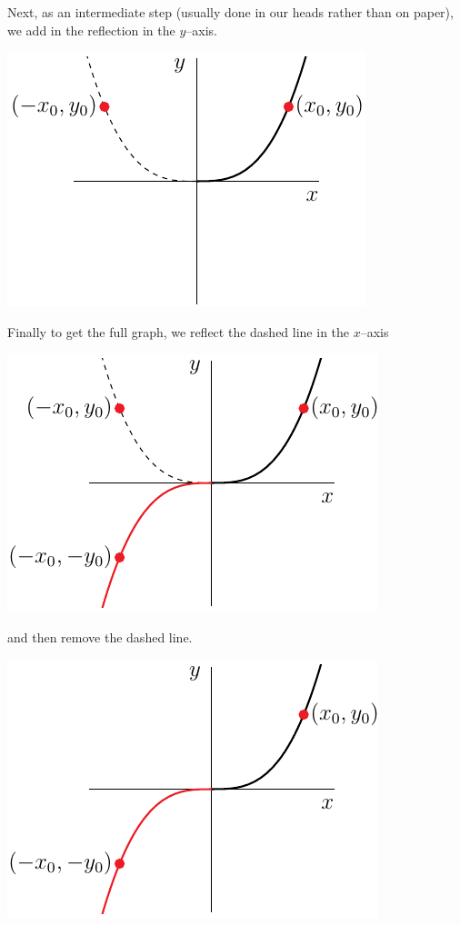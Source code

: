 Next, as an intermediate step (usually done in our heads rather than on
paper), we add in the reflection in the $y$--axis.
\begin{efig}
\begin{center}
   \includegraphics{oddInt}
\end{center}
\end{efig}
Finally to get the full graph, we reflect the dashed line in the $x$--axis
\begin{efig}
\begin{center}
   \includegraphics{oddFullInt}
\end{center}
\end{efig}
and then remove the dashed line.
\begin{efig}
\begin{center}
   \includegraphics{oddFull}
\end{center}
\end{efig}



